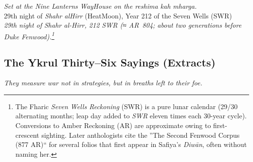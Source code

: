 \documentclass[11pt]{article}
\begin{document}
\begin{flushright}\small
\textit{Set at the Nine Lanterns Way\textendash House on the \emph{reshima kah mharga}.}\\
29th night of \emph{Shahr al\textendash Hirr} (Heat\textendash Moon), Year 212 of the Seven Wells (SWR)\\
	\textit{29th night of Shahr al-Hirr, 212 \textsc{SWR} (≈ AR~804; about two generations before Duke Fenwood).\footnote{The Fharic \emph{Seven Wells Reckoning} (SWR) is a pure lunar calendar (29/30 alternating months; leap day added to \emph{SWR} eleven times each 30-year cycle). Conversions to Amber Reckoning (AR) are approximate owing to first-crescent sighting. Later anthologists cite the ''The Second Fenwood Corpus (877 AR)`` for several folios that first appear in Safiya's \emph{Diwān}, often without naming her.}}
\end{flushright}

\clearpage

\subsection*{The Ykrul Thirty--Six Sayings \textnormal{(Extracts)}}
\noindent\emph{They measure war not in strategies, but in breaths left to their foe.}
\end{document}
